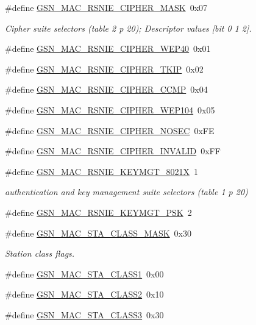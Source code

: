\begin{DoxyCompactItemize}
\item 
\#define \hyperlink{a00642_ga9f1db3741ca60ee70690fe908f615b05}{GSN\_\-MAC\_\-RSNIE\_\-CIPHER\_\-MASK}~0x07
\begin{DoxyCompactList}\small\item\em Cipher suite selectors (table 2 p 20); Descriptor values \mbox{[}bit 0 1 2\mbox{]}. \end{DoxyCompactList}\item 
\#define \hyperlink{a00642_gabb256ee389628678d07227a262c724cd}{GSN\_\-MAC\_\-RSNIE\_\-CIPHER\_\-WEP40}~0x01
\item 
\#define \hyperlink{a00642_ga923f017a53927b85c88857723b490d0f}{GSN\_\-MAC\_\-RSNIE\_\-CIPHER\_\-TKIP}~0x02
\item 
\#define \hyperlink{a00642_gae128a6f53a21ed1dd5cc751f5f76b063}{GSN\_\-MAC\_\-RSNIE\_\-CIPHER\_\-CCMP}~0x04
\item 
\#define \hyperlink{a00642_ga4a472fd868a0633cf337c1a3c4b0a8ed}{GSN\_\-MAC\_\-RSNIE\_\-CIPHER\_\-WEP104}~0x05
\item 
\#define \hyperlink{a00642_ga29ef5d37177a52a22dd6707dd3e943cf}{GSN\_\-MAC\_\-RSNIE\_\-CIPHER\_\-NOSEC}~0xFE
\item 
\#define \hyperlink{a00642_ga6498ff5acf21d809adebf490aaeb1158}{GSN\_\-MAC\_\-RSNIE\_\-CIPHER\_\-INVALID}~0xFF
\end{DoxyCompactItemize}
\begin{DoxyCompactItemize}
\item 
\#define \hyperlink{a00642_ga66753c440ce19038fd3676c28b340ba3}{GSN\_\-MAC\_\-RSNIE\_\-KEYMGT\_\-8021X}~1
\begin{DoxyCompactList}\small\item\em authentication and key management suite selectors (table 1 p 20) \end{DoxyCompactList}\item 
\#define \hyperlink{a00642_ga32b9e4b675a4ef0664691d13d70e1b1b}{GSN\_\-MAC\_\-RSNIE\_\-KEYMGT\_\-PSK}~2
\end{DoxyCompactItemize}
\begin{DoxyCompactItemize}
\item 
\#define \hyperlink{a00642_ga01d15be8069f353fa7376360929eeb2f}{GSN\_\-MAC\_\-STA\_\-CLASS\_\-MASK}~0x30
\begin{DoxyCompactList}\small\item\em Station class flags. \end{DoxyCompactList}\item 
\#define \hyperlink{a00642_gaf0688616f5b52712d7fbc5f2a10896c1}{GSN\_\-MAC\_\-STA\_\-CLASS1}~0x00
\item 
\#define \hyperlink{a00642_ga0127205e69cce6c11a8b87d6562c5623}{GSN\_\-MAC\_\-STA\_\-CLASS2}~0x10
\item 
\#define \hyperlink{a00642_ga0da606a37b3024d9bf42760219f526be}{GSN\_\-MAC\_\-STA\_\-CLASS3}~0x30
\end{DoxyCompactItemize}
